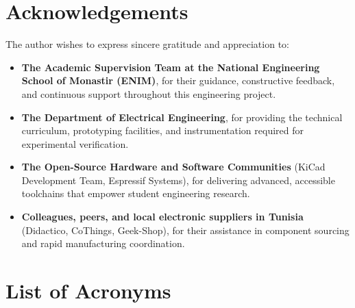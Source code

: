 \documentclass[12pt,a4paper,oneside]{report}
\begin{document}
\newpage

\chapter*{Acknowledgements}
The author wishes to express sincere gratitude and appreciation to:
\begin{itemize}[leftmargin=1.5cm, label=$\bullet$]
    \item \textbf{The Academic Supervision Team at the National Engineering School of Monastir (ENIM)}, for their guidance, constructive feedback, and continuous support throughout this engineering project.
    \item \textbf{The Department of Electrical Engineering}, for providing the technical curriculum, prototyping facilities, and instrumentation required for experimental verification.
    \item \textbf{The Open-Source Hardware and Software Communities} (KiCad Development Team, Espressif Systems), for delivering advanced, accessible toolchains that empower student engineering research.
    \item \textbf{Colleagues, peers, and local electronic suppliers in Tunisia} (Didactico, CoThings, Geek-Shop), for their assistance in component sourcing and rapid manufacturing coordination.
\end{itemize}

\newpage

\tableofcontents
\listoffigures
\listoftables

\newpage

\chapter*{List of Acronyms}
\end{document}
